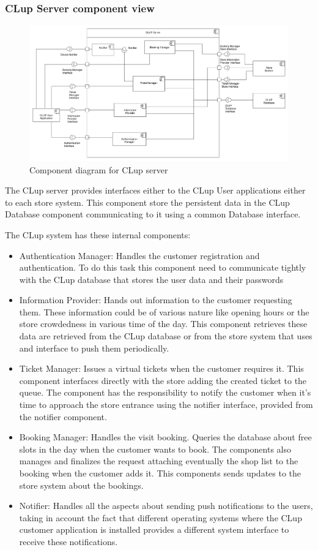 \subsubsection{CLup Server component view}
\begin{figure}[H]
    \includegraphics[width=\textwidth]{Images/UML_server_component.pdf}
    \caption{\label{fig:UML_comp_Clup_server}Component diagram for CLup server}
\end{figure}

The CLup server provides interfaces either to the CLup User applications either to each store system. This component store the persistent data in the CLup Database component communicating to it using a common Database interface.

The CLup system has these internal components:
\begin{itemize}
    \item Authentication Manager: Handles the customer registration and authentication. To do this task this component need to communicate tightly with the CLup database that stores the user data and their passwords
    \item Information Provider: Hands out information to the customer requesting them. These information could be of various nature like opening hours or the store crowdedness in various time of the day. This component retrieves these data are retrieved from the CLup database or from the store system that uses and interface to push them periodically.
    \item Ticket Manager: Issues a virtual tickets when the customer requires it. This component interfaces directly with the store adding the created ticket to the queue. The component has the responsibility to notify the customer when it's time to approach the store entrance using the notifier interface, provided from the notifier component.
    \item Booking Manager: Handles the visit booking. Queries the database about free slots in the day when the customer wants to book. The components also manages and finalizes the request attaching eventually the shop list to the booking when the customer adds it. This components sends updates to the store system about the bookings.
    \item Notifier: Handles all the aspects about sending push notifications to the users, taking in account the fact that different operating systems where the CLup customer application is installed provides a different system interface to receive these notifications. 
\end{itemize}

